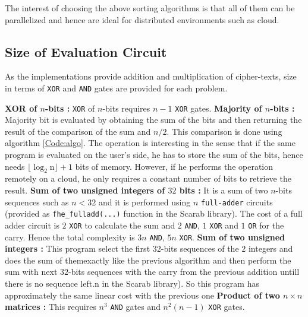 \documentclass{acm_proc_article-sp}
\begin{document}
The interest of choosing the above sorting algorithms is that all of them can be parallelized and hence are ideal for distributed environments such as cloud. 

\subsection{Size of Evaluation Circuit}
As the implementations provide addition and multiplication of cipher-texts,  size in terms of \texttt{XOR} and \texttt{AND} gates are provided for each problem. 

\textbf{XOR of $n$-bits :} \texttt{XOR} of $n$-bits requires $n-1$ \texttt{XOR} gates. \newline \newline
\textbf{Majority of $n$-bits :} Majority bit is evaluated by obtaining the sum of the bits and then returning the result of the comparison of the sum and $n/2$. This comparison is done using algorithm \autoref{Code:algo}. The operation is interesting in the sense that if the same program is evaluated on the user's side, he has to store the sum of the bits, hence  needs $\mathrm{\lfloor\log_{2}n \rfloor +1}$ bits of memory. However, if he performs the operation remotely on a cloud, he only requires a constant number of bits to retrieve the result. \newline \newline
\textbf{Sum of two unsigned integers of $32$ bits :} It is a sum of two $n$-bits sequences such as $n<32$ and it is performed using $n$ \texttt{full-adder} circuits (provided as \texttt{fhe\_fulladd(...)} function in the Scarab library). The cost of a full adder circuit is $2$ \texttt{XOR} to calculate the sum and $2$ \texttt{AND}, $1$ \texttt{XOR} and $1$ \texttt{OR} for the carry. Hence the total complexity is $3n$ \texttt{AND}, $5n$ \texttt{XOR}. \newline \newline
\textbf{Sum of two unsigned integers :} This program select the first $32$-bits sequences of the $2$ integers and does the sum of themexactly like the previous algorithm and then perform the sum with next $32$-bits sequences with the carry from the previous addition untill there is no sequence left.n in the Scarab library). So this program has approximately the same linear cost with the previous one \newline \newline
\textbf{Product of two $n\times n$ matrices :} This requires $n^3$ \texttt{AND} gates and \texttt{$n^2(n-1)$} \texttt{XOR} gates. \newline \newline
\end{document}

